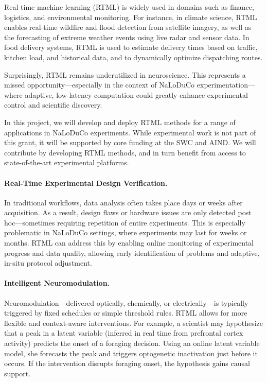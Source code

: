 \label{sec:rtmlNeuro}

Real-time machine learning (RTML) is widely used in domains such as finance, logistics, and environmental monitoring. For instance, in climate science, RTML enables real-time wildfire and flood detection from satellite imagery, as well as the forecasting of extreme weather events using live radar and sensor data. In food delivery systems, RTML is used to estimate delivery times based on traffic, kitchen load, and historical data, and to dynamically optimize dispatching routes.

Surprisingly, RTML remains underutilized in neuroscience. This represents a missed opportunity—especially in the context of NaLoDuCo experimentation—where adaptive, low-latency computation could greatly enhance experimental control and scientific discovery.

In this project, we will develop and deploy RTML methods for a range of applications in NaLoDuCo experiments. While experimental work is not part of this grant, it will be supported by core funding at the SWC and AIND. We will contribute by developing RTML methods, and in turn benefit from access to state-of-the-art experimental platforms.

\paragraph{Real-Time Experimental Design Verification.}
In traditional workflows, data analysis often takes place days or weeks after acquisition. As a result, design flaws or hardware issues are only detected post hoc—sometimes requiring repetition of entire experiments. This is especially problematic in NaLoDuCo settings, where experiments may last for weeks or months. RTML can address this by enabling online monitoring of experimental progress and data quality, allowing early identification of problems and adaptive, in-situ protocol adjustment.

\paragraph{Intelligent Neuromodulation.}
Neuromodulation—delivered optically, chemically, or electrically—is typically triggered by fixed schedules or simple threshold rules. RTML allows for more flexible and context-aware interventions. For example, a scientist may hypothesize that a peak in a latent variable (inferred in real time from prefrontal cortex activity) predicts the onset of a foraging decision. Using an online latent variable model, she forecasts the peak and triggers optogenetic inactivation just before it occurs. If the intervention disrupts foraging onset, the hypothesis gains causal support.

